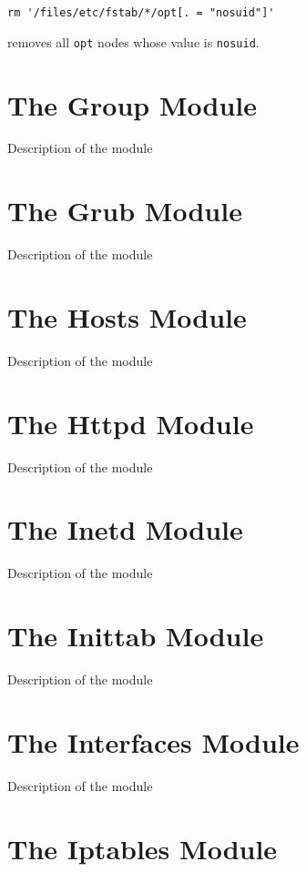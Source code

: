 \begin{verbatim}
rm '/files/etc/fstab/*/opt[. = "nosuid"]'
\end{verbatim}

removes all \verb!opt! nodes whose value is \verb!nosuid!.

\section{The Group Module}

Description of the module

\section{The Grub Module}

Description of the module

\section{The Hosts Module}

Description of the module

\section{The Httpd Module}

Description of the module

\section{The Inetd Module}

Description of the module

\section{The Inittab Module}

Description of the module

\section{The Interfaces Module}

Description of the module

\section{The Iptables Module}


